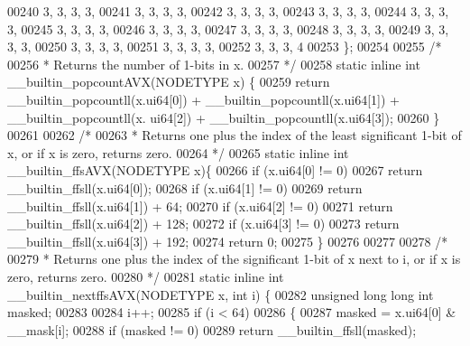 \begin{DoxyCode}
00240         3, 3, 3, 3,
00241         3, 3, 3, 3,
00242         3, 3, 3, 3,
00243         3, 3, 3, 3,
00244         3, 3, 3, 3,
00245         3, 3, 3, 3,
00246         3, 3, 3, 3,
00247         3, 3, 3, 3,
00248         3, 3, 3, 3,
00249         3, 3, 3, 3,
00250         3, 3, 3, 3,
00251         3, 3, 3, 3,
00252         3, 3, 3, 4
00253 \};
00254 
00255 \textcolor{comment}{/*}
00256 \textcolor{comment}{ * Returns the number of 1-bits in x.}
00257 \textcolor{comment}{ */}
00258 \textcolor{keyword}{static} \textcolor{keyword}{inline} \textcolor{keywordtype}{int} \_\_builtin\_popcountAVX(NODETYPE x) \{
00259         \textcolor{keywordflow}{return} \_\_builtin\_popcountll(x.ui64[0]) + \_\_builtin\_popcountll(x.ui64[1]) + \_\_builtin\_popcountll(x.
      ui64[2]) + \_\_builtin\_popcountll(x.ui64[3]);
00260 \}
00261 
00262 \textcolor{comment}{/*}
00263 \textcolor{comment}{ * Returns one plus the index of the least significant 1-bit of x, or if x is zero, returns zero.}
00264 \textcolor{comment}{ */}
00265 \textcolor{keyword}{static} \textcolor{keyword}{inline} \textcolor{keywordtype}{int} \_\_builtin\_ffsAVX(NODETYPE x)\{
00266         \textcolor{keywordflow}{if} (x.ui64[0] != 0)
00267                 \textcolor{keywordflow}{return} \_\_builtin\_ffsll(x.ui64[0]);
00268         \textcolor{keywordflow}{if} (x.ui64[1] != 0)
00269                 \textcolor{keywordflow}{return} \_\_builtin\_ffsll(x.ui64[1]) + 64;
00270         \textcolor{keywordflow}{if} (x.ui64[2] != 0)
00271                 \textcolor{keywordflow}{return} \_\_builtin\_ffsll(x.ui64[2]) + 128;
00272         \textcolor{keywordflow}{if} (x.ui64[3] != 0)
00273                 \textcolor{keywordflow}{return} \_\_builtin\_ffsll(x.ui64[3]) + 192;
00274         \textcolor{keywordflow}{return} 0;
00275 \}
00276 
00277 
00278 \textcolor{comment}{/*}
00279 \textcolor{comment}{ * Returns one plus the index of the significant 1-bit of x next to i, or if x is zero, returns zero.}
00280 \textcolor{comment}{ */}
00281 \textcolor{keyword}{static} \textcolor{keyword}{inline} \textcolor{keywordtype}{int} \_\_builtin\_nextffsAVX(NODETYPE x, \textcolor{keywordtype}{int} i) \{
00282         \textcolor{keywordtype}{unsigned} \textcolor{keywordtype}{long} \textcolor{keywordtype}{long} \textcolor{keywordtype}{int} masked;
00283 
00284         i++;
00285         \textcolor{keywordflow}{if} (i < 64)
00286         \{
00287                 masked = x.ui64[0] & \_\_mask[i];
00288                 \textcolor{keywordflow}{if} (masked != 0)
00289                         \textcolor{keywordflow}{return} \_\_builtin\_ffsll(masked);

\end{DoxyCode}
